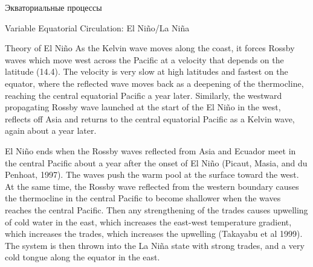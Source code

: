 \begin{chapter}{Экваториальные процессы}
\begin{section}{Variable Equatorial Circulation: El Ni\~{n}o/La Ni\~{n}a}
\begin{paragraph}{Theory of El Ni\~{n}o}
As the Kelvin wave moves along the coast, it
forces Rossby waves which move west across the Pacific at a velocity
that depends on the latitude (14.4). The velocity is very slow at high
latitudes and fastest on the equator, where the reflected wave moves
back as a deepening of the thermocline,
reaching the central equatorial Pacific a year later. Similarly, the
westward propagating Rossby wave launched at the
start of the El Ni\~{n}o in the west, reflects off Asia and returns to
the central equatorial Pacific as a Kelvin wave, again about a year
later.
%

El Ni\~{n}o ends when the Rossby waves reflected from Asia and Ecuador
meet in the central Pacific about a year after the onset of El
Ni\~{n}o (Picaut, Masia, and du Penhoat, 1997). The waves push the
warm pool at the surface toward the west. At the same time, the
Rossby wave reflected from the western boundary
causes the thermocline in the central
Pacific to become shallower when the waves reaches the central
Pacific. Then any strengthening of the trades causes
upwelling of cold water in the east, which
increases the east-west temperature gradient, which increases the
trades, which increases the upwelling (Takayabu et al 1999). The
system is then thrown into the La Ni\~{n}a state with strong trades,
and a very cold tongue along the equator in the east.
%


\end{paragraph}
\end{section}
\end{chapter}

